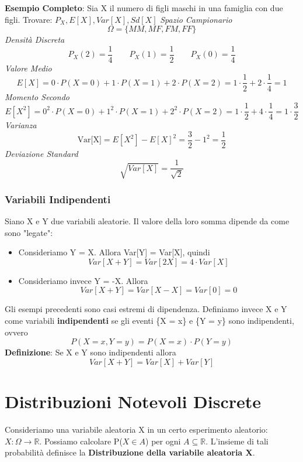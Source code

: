 \begin{tcolorbox}
    \textbf{Esempio Completo}: Sia X il numero di figli maschi in una famiglia con due figli. Trovare: $P_X, E[X], Var[X], Sd[X]$ \newline
    \textit{Spazio Campionario} $$\Omega = \{MM, MF, FM, FF\}$$ 
    \textit{Densità Discreta} $$P_X(2) = {\dfrac{1}{4}}  \qquad P_X(1) = {\dfrac{1}{2}} \qquad P_X(0) = {\dfrac{1}{4}}$$
    \textit{Valore Medio} $$E[X] = 0 \cdot P(X = 0) + 1 \cdot P(X = 1) + 2 \cdot P(X = 2) = 1 \cdot \dfrac{1}{2} + 2 \cdot \dfrac{1}{4} = 1$$
    \textit{Momento Secondo} $$E[X^2] = 0^2 \cdot P(X = 0) + 1^2 \cdot P(X = 1) + 2^2 \cdot P(X = 2) = 1 \cdot \dfrac{1}{2} + 4 \cdot \dfrac{1}{4} = 1 \cdot \dfrac{3}{2} $$
    \textit{Varianza} $$ \text{Var[X]} = E[X^2] - E[X]^2= \dfrac{3}{2} - 1^2= \dfrac{1}{2}$$ 
    \textit{Deviazione Standard} $$ \sqrt{Var[X]} = \dfrac{1}{\sqrt{2}}$$
\end{tcolorbox}

\subsubsection{Variabili Indipendenti}

Siano X e Y due variabili aleatorie. Il valore della loro somma dipende da come sono "legate":
\begin{itemize}
    \item  Consideriamo Y = X. Allora Var[Y] = Var[X], quindi $$Var[X + Y]= Var[2X] = 4 \cdot Var[X]$$ 
    \item Consideriamo invece Y = -X. Allora $$Var[X + Y] = Var[X - X] = Var[0] = 0$$
\end{itemize}

\noindent Gli esempi precedenti sono casi estremi di dipendenza. Definiamo invece X e Y come variabili \textbf{indipendenti} se gli eventi \{X = x\} e \{Y = y\} sono indipendenti, ovvero $$P(X = x, Y = y) = P(X = x) \cdot P(Y = y)$$ 
\noindent \textbf{Definizione}: Se X e Y sono indipendenti allora $$ Var[X + Y] = Var[X] + Var[Y]$$

\section{Distribuzioni Notevoli Discrete}

Consideriamo una variabile aleatoria X in un certo esperimento aleatorio: $X : \Omega \xrightarrow{} \mathbb{R}$. Possiamo calcolare P($X \in A$) per ogni $A \subseteq \mathbb{R}$.
L'insieme di tali probabilità definisce la \textbf{Distribuzione della variabile aleatoria X}. \newline

